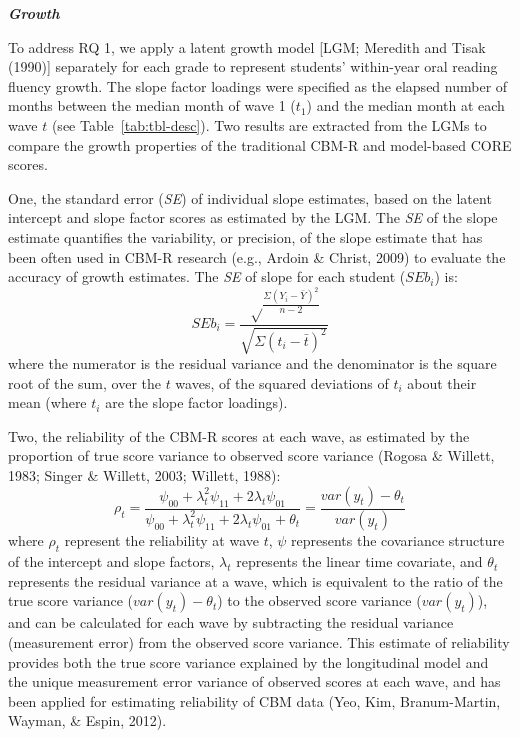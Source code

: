 \documentclass[
  english,
  man, fleqn, noextraspace]{apa6}
\begin{document}
\textbf{\emph{Growth}}

To address RQ 1, we apply a latent growth model {[}LGM; Meredith and Tisak (1990){]} separately for each grade to represent students' within-year oral reading fluency growth. The slope factor loadings were specified as the elapsed number of months between the median month of wave 1 (\(t_1\)) and the median month at each wave \(t\) (see Table~\ref{tab:tbl-desc}). Two results are extracted from the LGMs to compare the growth properties of the traditional CBM-R and model-based CORE scores.

One, the standard error (\emph{SE}) of individual slope estimates, based on the latent intercept and slope factor scores as estimated by the LGM. The \emph{SE} of the slope estimate quantifies the variability, or precision, of the slope estimate that has been often used in CBM-R research (e.g., Ardoin \& Christ, 2009) to evaluate the accuracy of growth estimates. The \emph{SE} of slope for each student (\(SEb_i\)) is:
\[
SEb_i = \frac{\sqrt\frac{\Sigma(Y_i - \bar{Y})^2}{n - 2}}{\sqrt{\Sigma(t_i - \bar{t})^2}}
\]
where the numerator is the residual variance and the denominator is the square root of the sum, over the \(t\) waves, of the squared deviations of \(t_i\) about their mean (where \(t_i\) are the slope factor loadings).

Two, the reliability of the CBM-R scores at each wave, as estimated by the proportion of true score variance to observed score variance (Rogosa \& Willett, 1983; Singer \& Willett, 2003; Willett, 1988):
\[
\rho_t = \frac{\psi_{00} + \lambda^2_t \psi_{11} + 2\lambda_t \psi_{01}}{\psi_{00} + \lambda^2_t \psi_{11} + 2\lambda_t \psi_{01} + \theta_t} = \frac{var(y_t) - \theta_t}{var(y_t)}
\]
where \(\rho_t\) represent the reliability at wave \(t\), \(\psi\) represents the covariance structure of the intercept and slope factors, \(\lambda_t\) represents the linear time covariate, and \(\theta_t\) represents the residual variance at a wave, which is equivalent to the ratio of the true score variance (\(var(y_t) - \theta_t\)) to the observed score variance (\(var(y_t)\)), and can be calculated for each wave by subtracting the residual variance (measurement error) from the observed score variance. This estimate of reliability provides both the true score variance explained by the longitudinal model and the unique measurement error variance of observed scores at each wave, and has been applied for estimating reliability of CBM data (Yeo, Kim, Branum-Martin, Wayman, \& Espin, 2012).
\end{document}
